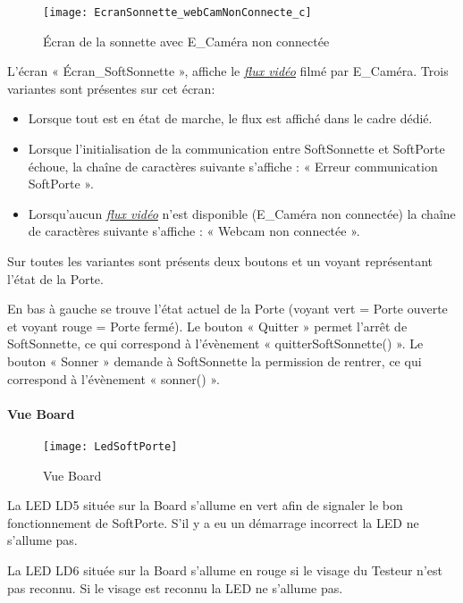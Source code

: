\begin{figure} [H]
    \centering
    \texttt{[image: EcranSonnette\_webCamNonConnecte\_c]}
    \caption{Écran de la sonnette avec E\_Caméra non connectée}
    \label{Écran de la sonnette webCam non connectée}
\end{figure}

L’écran « Écran\_SoftSonnette », affiche le \hyperlink{video}{\textit{flux vidéo}} filmé par E\_Caméra. 
Trois variantes sont présentes sur cet écran: \\
\begin {itemize}
    \item Lorsque tout est en état de marche, le flux est affiché dans le cadre dédié.
    \item Lorsque l'initialisation de la communication entre SoftSonnette et SoftPorte échoue, la chaîne de caractères suivante s'affiche : « Erreur communication SoftPorte ».
    \item Lorsqu'aucun \hyperlink{video}{\textit{flux vidéo}} n'est disponible (E\_Caméra non connectée) la chaîne de caractères suivante s'affiche : « Webcam non connectée ».
\end{itemize}
Sur toutes les variantes sont présents deux boutons et un voyant représentant l'état de la Porte.

En bas à gauche se trouve l'état actuel de la Porte (voyant vert = Porte ouverte et voyant rouge = Porte fermé).
Le bouton « Quitter » permet l'arrêt de SoftSonnette, ce qui correspond à l'évènement « quitterSoftSonnette() ». 
Le bouton « Sonner » demande à SoftSonnette la permission de rentrer, ce qui correspond à l'évènement « sonner() ».

\paragraph{Vue Board}
\hypertarget{EcranSoftPorte}{}

\begin{figure} [H]
    \centering
    \texttt{[image: LedSoftPorte]}
    \caption{Vue Board}
    \label{Vue Board}
\end{figure}

La LED LD5 située sur la Board s'allume en vert afin de signaler le bon fonctionnement de SoftPorte. 
S'il y a eu un démarrage incorrect la LED ne s'allume pas.

La LED LD6 située sur la Board s'allume en rouge si le visage du Testeur n'est pas reconnu.
Si le visage est reconnu la LED ne s'allume pas. 
